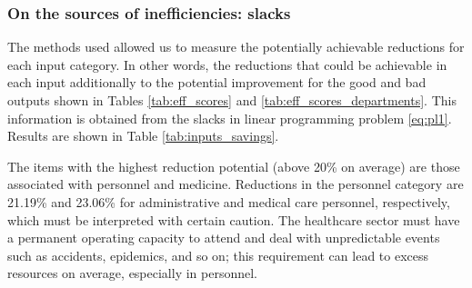 \documentclass[11pt,a4paper,oneside]{article}
\begin{document}
\color{black}

\subsubsection{On the sources of inefficiencies: slacks}



The methods used allowed us to measure the potentially achievable reductions for each input category. \color{blue} In other words, the reductions that could be  achievable in each input additionally to the potential improvement for the good and bad outputs shown in Tables \ref{tab:eff_scores} and \ref{tab:eff_scores_departments}. \color{black} This information is obtained from the slacks in linear programming problem \eqref{eq:pl1}. Results are shown in Table \ref{tab:inputs_savings}.  



The items with the highest reduction potential (above 20\% on average) are those associated with personnel and medicine. Reductions in the personnel category are 21.19\% and 23.06\% for administrative and medical care personnel, respectively, which must be interpreted with certain caution. The healthcare sector must have a permanent operating capacity to attend and deal with unpredictable events such as accidents, epidemics, and so on; this requirement can lead to excess resources on average, especially in personnel.


\end{document}
